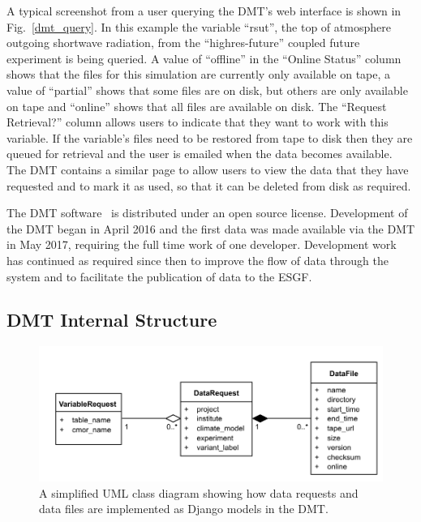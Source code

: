 \documentclass[gmd, manuscript]{copernicus}
\begin{document}
A typical screenshot from a user querying the DMT's web interface is shown in Fig.~\ref{dmt_query}. In this example the variable ``rsut'', the top of atmosphere outgoing shortwave radiation, from the ``highres-future'' coupled future experiment is being queried. A value of ``offline'' in the ``Online Status'' column shows that the files for this simulation are currently only available on tape, a value of ``partial'' shows that some files are on disk, but others are only available on tape and ``online'' shows that all files are available on disk. The ``Request Retrieval?'' column allows users to indicate that they want to work with this variable. If the variable's files need to be restored from tape to disk then they are queued for retrieval and the user is emailed when the data becomes available. The DMT contains a similar page to allow users to view the data that they have requested and to mark it as used, so that it can be deleted from disk as required.

The DMT software~\citep{Seddon2019} is distributed under an open source license. Development of the DMT began in April 2016 and the first data was made available via the DMT in May 2017, requiring the full time work of one developer. Development work has continued as required since then to improve the flow of data through the system and to facilitate the publication of data to the ESGF. 

\subsection{DMT Internal Structure}

\begin{figure}[t]
	\includegraphics[width=12cm]{fig04.pdf}
	\caption{A simplified UML class diagram showing how data requests and data files are implemented as Django models in the DMT.}
	\label{dmt_struture}
\end{figure}
\end{document}
